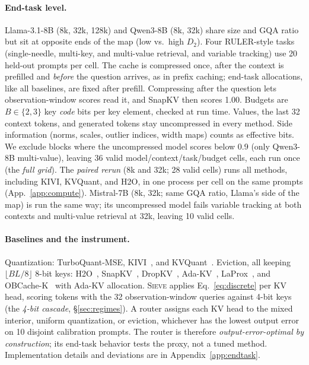 \documentclass{article}
\newcommand{\sieve}{\textsc{Sieve}}
\theoremstyle{definition}
\begin{document}
\paragraph{End-task level.}
Llama-3.1-8B (8k, 32k, 128k) and Qwen3-8B (8k, 32k) share size and GQA ratio but sit at opposite ends of the map (low vs.\ high $D_2$).  Four RULER-style tasks~\citep{hsieh2024ruler} (single-needle, multi-key, and multi-value retrieval, and variable tracking) use 20 held-out prompts per cell.  The cache is compressed once, after the context is prefilled and \emph{before} the question arrives, as in prefix caching; end-task allocations, like all baselines, are fixed after prefill.  Compressing after the question lets observation-window scores read it, and SnapKV then scores 1.00.  Budgets are $B\in\{2,3\}$ key \emph{code} bits per key element, checked at run time.  Values, the last 32 context tokens, and generated tokens stay uncompressed in every method.  Side information (norms, scales, outlier indices, width maps) counts as effective bits.  We exclude blocks where the uncompressed model scores below 0.9 (only Qwen3-8B multi-value), leaving 36 valid model/context/task/budget cells, each run once (the \emph{full grid}).  The \emph{paired rerun} (8k and 32k; 28 valid cells) runs all methods, including KIVI, KVQuant, and H2O, in one process per cell on the same prompts (App.~\ref{app:compute}).  Mistral-7B (8k, 32k; same GQA ratio, Llama's side of the map) is run the same way; its uncompressed model fails variable tracking at both contexts and multi-value retrieval at 32k, leaving 10 valid cells.

\paragraph{Baselines and the instrument.}
Quantization: TurboQuant-MSE, KIVI~\citep{liu2024kivi}, and KVQuant~\citep{hooper2024kvquant}.  Eviction, all keeping $\lfloor BL/8\rfloor$ 8-bit keys: H2O~\citep{zhang2023h2o}, SnapKV~\citep{li2024snapkv}, DropKV~\citep{zhang2026dropkv}, Ada-KV~\citep{feng2024adakv}, LaProx~\citep{mai2026laprox}, and OBCache-K~\citep{gu2026obcache} with Ada-KV allocation.  \sieve{} applies Eq.~\ref{eq:discrete} per KV head, scoring tokens with the 32 observation-window queries against 4-bit keys (the \emph{4-bit cascade}, \S\ref{sec:regimes}).  A router assigns each KV head to the mixed interior, uniform quantization, or eviction, whichever has the lowest output error on 10 disjoint calibration prompts.  The router is therefore \emph{output-error-optimal by construction}; its end-task behavior tests the proxy, not a tuned method.  Implementation details and deviations are in Appendix~\ref{app:endtask}.
\end{document}
